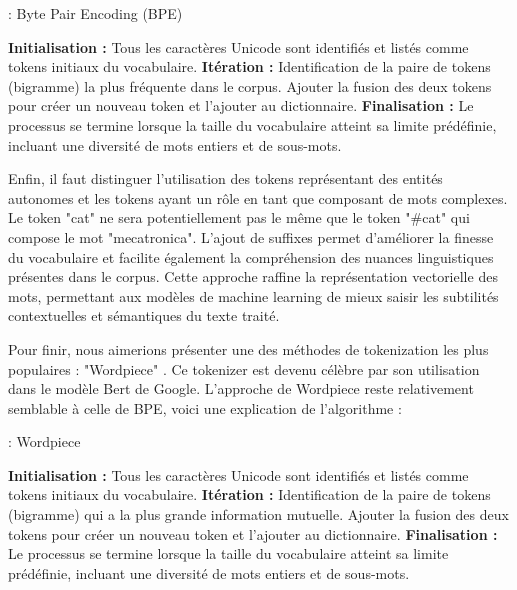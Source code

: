 \documentclass[12pt]{article}
\theoremstyle{definition}
\begin{document}
\begin{algorithm}
	\caption{ : Byte Pair Encoding (BPE)}
	\vspace{0.5em}  %
	\begin{algorithmic}[]
		\State \textbf{Initialisation :} Tous les caractères Unicode sont identifiés et listés comme tokens initiaux du vocabulaire.
		\State \textbf{Itération :} Identification de la paire de tokens (bigramme) la plus fréquente dans le corpus. Ajouter la fusion des deux tokens pour créer un nouveau token et l'ajouter au dictionnaire.
		\State \textbf{Finalisation :} Le processus se termine lorsque la taille du vocabulaire atteint sa limite prédéfinie, incluant une diversité de mots entiers et de sous-mots.
	\end{algorithmic}
\end{algorithm}
	
	Enfin, il faut distinguer l'utilisation des tokens représentant des entités autonomes et les tokens ayant un rôle en tant que composant de mots complexes. Le token "cat" ne sera potentiellement pas le même que le token "\#cat" qui compose le mot "mecatronica". L'ajout de suffixes permet d'améliorer la finesse du vocabulaire et facilite également la compréhension des nuances linguistiques présentes dans le corpus. Cette approche raffine la représentation vectorielle des mots, permettant aux modèles de machine learning de mieux saisir les subtilités contextuelles et sémantiques du texte traité.
	
	Pour finir, nous aimerions présenter une des méthodes de tokenization les plus populaires : "Wordpiece" \cite{Wordpiece}. Ce tokenizer est devenu célèbre par son utilisation dans le modèle Bert de Google. L'approche de Wordpiece reste relativement semblable à celle de BPE, voici une explication de l'algorithme :  
	
	\begin{algorithm}
		\caption{ : Wordpiece}
		\vspace{0.5em}  %
		\begin{algorithmic}[]
			\State \textbf{Initialisation :} Tous les caractères Unicode sont identifiés et listés comme tokens initiaux du vocabulaire.
			\State \textbf{Itération :} Identification de la paire de tokens (bigramme) qui a la plus grande information mutuelle. Ajouter la fusion des deux tokens pour créer un nouveau token et l'ajouter au dictionnaire.
			\State \textbf{Finalisation :} Le processus se termine lorsque la taille du vocabulaire atteint sa limite prédéfinie, incluant une diversité de mots entiers et de sous-mots.
		\end{algorithmic}
	\end{algorithm}
\end{document}
